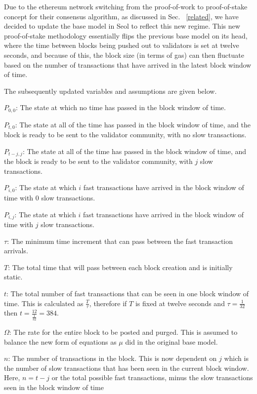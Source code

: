 \documentclass[conference]{IEEEtran}
\begin{document}
Due to the ethereum network switching from the proof-of-work to proof-of-stake 
concept for their consensus algorithm, as discussed in Sec. ~\ref{related}, we have decided to update
the base model in Seol\cite{2020_ACM_Seol} to reflect this new regime. This 
new proof-of-stake methodology essentially flips the previous base model on its 
head, where the time between blocks being pushed out to validators is set at twelve 
seconds, and because of this, the block size (in terms of gas) can then fluctuate based 
on the number of transactions that have arrived in the latest block window of time. 

The subsequently updated variables and assumptions are given below. 

$P_{0,0}$: The state at which no time has passed in the block window of time. 

$P_{t,0}$: The state at all of the time has passed in the block window of time, and
the block is ready to be sent to the validator community, with no slow transactions. 

$P_{t-j,j}$: The state at all of the time has passed in the block window of time, and
the block is ready to be sent to the validator community, with $j$ slow transactions. 

$P_{i,0}$: The state at which $i$ fast transactions have arrived in the 
block window of time with 0 slow transactions. 

$P_{i,j}$: The state at which $i$ fast transactions have arrived in the 
block window of time with $j$ slow transactions. 

$\tau$: The minimum time increment that can pass between the 
fast transaction arrivals. 

$T$: The total time that will pass between each block creation and is initially static.

$t$: The total number of fast transactions that can be seen in one block window of time.
This is calculated as $\frac{T}{\tau}$, therefore if $T$ is fixed at twelve seconds and
$\tau=\frac{1}{32}$ then $t=\frac{12}{\frac{1}{32}}=384$. 

$\Omega$: The rate for the entire block to be posted and purged. This is assumed
to balance the new form of equations as $\mu$ did in the original base model.

$n$: The number of transactions in the block. This is now dependent on $j$ which is
the number of slow transactions that has been seen in the current block window. Here, 
$n=t - j$ or the total possible fast transactions, minus the slow transactions seen in the
block window of time
\end{document}
